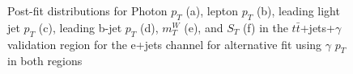 \begin{figure}[]
\hfil  
{}
\caption{Post-fit distributions for Photon $p_T$ (a), lepton $p_T$ (b), leading light jet $p_T$ (c), leading b-jet $p_T$ (d),  $m_T^W$  (e), and $S_T$ (f) in the $t\bar{t}$+jets+$\gamma$ validation region for the  e+jets channel for alternative fit using  $\gamma$ $p_T$ in both regions }
\end{figure}



















